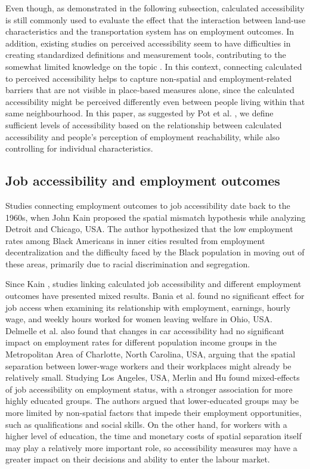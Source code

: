 \documentclass[preprint, 3p,
authoryear]{elsarticle} %
\begin{document}
Even though, as demonstrated in the following subsection, calculated
accessibility is still commonly used to evaluate the effect that the
interaction between land-use characteristics and the transportation
system has on employment outcomes. In addition, existing studies on
perceived accessibility seem to have difficulties in creating
standardized definitions and measurement tools, contributing to the
somewhat limited knowledge on the topic \citep{negm2025}. In this
context, connecting calculated to perceived accessibility helps to
capture non-spatial and employment‑related barriers that are not visible
in place‑based measures alone, since the calculated accessibility might
be perceived differently even between people living within that same
neighbourhood. In this paper, as suggested by Pot et al.
\citeyearpar{pot2025}, we define sufficient levels of accessibility
based on the relationship between calculated accessibility and people's
perception of employment reachability, while also controlling for
individual characteristics.

\subsection{Job accessibility and employment
outcomes}\label{job-accessibility-and-employment-outcomes}

Studies connecting employment outcomes to job accessibility date back to
the 1960s, when John Kain \citeyearpar{kain1968} proposed the spatial
mismatch hypothesis while analyzing Detroit and Chicago, USA. The author
hypothesized that the low employment rates among Black Americans in
inner cities resulted from employment decentralization and the
difficulty faced by the Black population in moving out of these areas,
primarily due to racial discrimination and segregation.

Since Kain \citeyearpar{kain1968}, studies linking calculated job
accessibility and different employment outcomes have presented mixed
results. Bania et al. \citeyearpar{bania2008} found no significant
effect for job access when examining its relationship with employment,
earnings, hourly wage, and weekly hours worked for women leaving welfare
in Ohio, USA. Delmelle et al. \citeyearpar{delmelle2021} also found that
changes in car accessibility had no significant impact on employment
rates for different population income groups in the Metropolitan Area of
Charlotte, North Carolina, USA, arguing that the spatial separation
between lower-wage workers and their workplaces might already be
relatively small. Studying Los Angeles, USA, Merlin and Hu
\citeyearpar{merlin2017} found mixed-effects of job accessibility on
employment status, with a stronger association for more highly educated
groups. The authors argued that lower-educated groups may be more
limited by non-spatial factors that impede their employment
opportunities, such as qualifications and social skills. On the other
hand, for workers with a higher level of education, the time and
monetary costs of spatial separation itself may play a relatively more
important role, so accessibility measures may have a greater impact on
their decisions and ability to enter the labour market.
\end{document}
